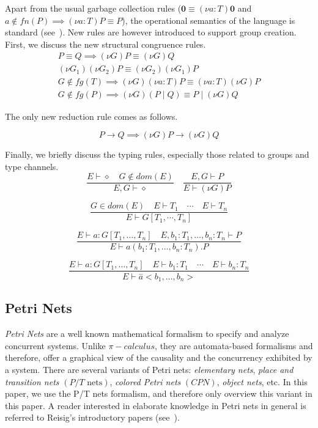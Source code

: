 Apart from the usual garbage collection rules ($\mathbf{0}\equiv (\nu a:T)\mathbf{0}$ and $a\notin fn(P)\implies (\nu
a:T)P\equiv P$), the operational semantics of the language is standard (see~\cite{Parrow:01}). New rules are however
introduced to support group creation. First, we discuss the new structural congruence rules.
\[
\left.\! \begin{array}{l}
P\equiv Q\implies (\nu G)P\equiv (\nu G)Q \\
(\nu G_1)(\nu G_2)P\equiv (\nu G_2)(\nu G_1)P\\
G\notin fg(T)\implies (\nu G)(\nu a:T)P\equiv (\nu a:T)(\nu G)P\\
G\notin fg(P)\implies (\nu G)(P\mid Q)\equiv P\mid (\nu G)Q
\end{array} \right.\!
\]

The only new reduction rule comes as follows.

\[P\rightarrow Q\implies (\nu G)P\rightarrow(\nu G)Q\]

Finally, we briefly discuss the typing rules, especially those related to groups and type channels.
\[
\frac{E\vdash\diamond \quad G\notin dom(E)}{E,G\vdash\diamond}\quad
\frac{E,G\vdash P}{E\vdash (\nu G)P}
\]

\[\frac{G\in dom(E) \quad E\vdash T_1\quad\cdots\quad E\vdash T_n}{E\vdash G[T_1,\cdots, T_n]}\]

\[
\frac{E\vdash a:G[T_1,\ldots,T_n] \quad E,b_1:T_1,\ldots,b_n:T_n\vdash P}{E\vdash a(b_1:T_1,\ldots,b_n:T_n).P}
\]

\[
\frac{E\vdash a:G[T_1,\ldots,T_n] \quad E\vdash b_1:T_1\quad\cdots\quad E\vdash b_n:T_n}{E\vdash \overset{-}{a}<b_1,\ldots,b_n>}
\]


\subsection{Petri Nets} %
\label{sub:petri_nets}

\emph{Petri Nets} are a well known mathematical formalism to specify and analyze concurrent systems. Unlike
$\pi-calculus$, they are automata-based formalisms and therefore, offer a graphical view of the causality and the
concurrency exhibited by a system. There are several variants of Petri nets: \emph{elementary nets}, \emph{place and
transition nets} $(P/T \mbox{ nets})$, \emph{colored Petri nets} $(CPN)$, \emph{object nets}, etc. In this paper, we use
the P/T nets formalism, and therefore only overview this variant in this paper. A reader interested in elaborate
knowledge in Petri nets in general is referred to Reisig's introductory papers
(see~\cite{Reisig:85,Reisig:98a,Reisig:98b}).

